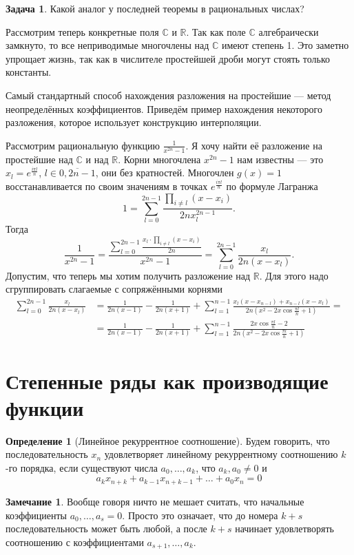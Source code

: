 \documentclass[10pt,a4paper,oneside]{book}
\theoremstyle{definition}
\newtheorem*{rem}{Замечание}
\newtheorem{zad}{Задача}
\newtheorem{defn}{Определение}
\newcommand{\mb}[1]{\mathbb{#1}}
\newcommand{\ovl}{\overline}
\def\dfn{\begin{defn}}
\def\edfn{\end{defn}}
\def\zd{\begin{zad}}
\def\ezd{\end{zad}}
\def\rm{\begin{rem}}
\def\erm{\end{rem}}
\begin{document}
\zd Какой аналог у последней теоремы в рациональных числах?
\ezd

Рассмотрим теперь конкретные поля $\mb C$ и $\mb R$. Так как поле $\mb C$ алгебраически замкнуто, то все неприводимые многочлены над $\mb C$ имеют степень 1. Это заметно упрощает жизнь, так как в числителе простейшей дроби могут стоять только константы. 

Самый стандартный способ нахождения разложения на простейшие --- метод неопределённых коэффициентов. Приведём пример нахождения некоторого разложения, которое использует конструкцию интерполяции.

Рассмотрим рациональную функцию $\frac{1}{x^{2n}-1}$. Я хочу найти её разложение на простейшие над $\mb C$ и над $\mb R$. Корни  многочлена $x^{2n}-1$ нам известны --- это $x_l=e^{\tfrac{i \pi l}{n}}$, $l\in \ovl{0,2n-1}$, они без кратностей. Многочлен $g(x)=1$ восстанавливается по своим значениям в точках  $e^{\tfrac{i \pi l}{n}}$ по формуле Лагранжа
$$1=\sum_{l=0}^{2n-1} \frac{ \prod_{i\neq l} (x-x_i)}{2nx_l^{2n-1}}.$$
Тогда 
$$\frac{1}{x^{2n}-1}=\frac{\sum_{l=0}^{2n-1} \frac{ x_l\cdot \prod_{i\neq l} (x-x_i)}{2n}}{x^{2n}-1}= \sum_{l=0}^{2n-1} \frac{x_l}{2n(x-x_l)}.$$
Допустим, что теперь мы хотим получить разложение над $\mb R$. Для этого надо сгруппировать слагаемые  с сопряжёнными корнями
$$
\begin{aligned}
\sum_{l=0}^{2n-1} \frac{x_l}{2n(x-x_l)}&= \frac{1}{2n(x-1)}-\frac{1}{2n(x+1)}+\sum_{l=1}^{n-1} \frac{x_l(x-x_{n-l})+x_{n-l}(x-x_l)}{2n(x^2-2x\cos\tfrac{\pi l}{n}+1)}= \\
&=\frac{1}{2n(x-1)}-\frac{1}{2n(x+1)}+\sum_{l=1}^{n-1} \frac{2x\cos\tfrac{\pi l}{n}-2}{2n(x^2-2x\cos\tfrac{\pi l}{n}+1)} \end{aligned} $$





\section{Степенные ряды как производящие функции}


\dfn[Линейное рекуррентное соотношение] Будем говорить, что последовательность $x_n$ удовлетворяет линейному рекуррентному соотношению $k$-го порядка, если существуют числа $a_0,\dots,a_{k}$, что $a_k,a_0\neq 0$ и 
$$a_k x_{n+k}+a_{k-1}x_{n+k-1}+\dots+a_0x_n=0$$
\edfn


\rm Вообще говоря ничто не мешает считать, что начальные коэффициенты $a_0,\dots,a_s=0$. Просто это означает, что до номера $k+s$ последовательность может быть любой, а после $k+s$ начинает удовлетворять соотношению с коэффициентами $a_{s+1},\dots,a_k$.
\erm
\end{document}
